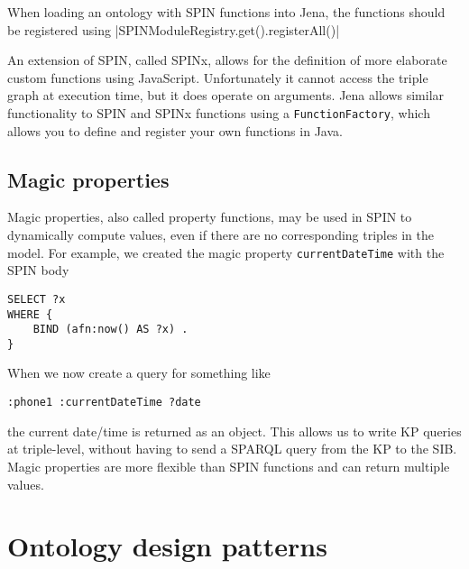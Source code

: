 
When loading an ontology with SPIN functions into Jena, the functions should be registered using |SPINModuleRegistry.get().registerAll()|

An extension of \ac{SPIN}, called SPINx, allows for the definition of more elaborate custom functions using JavaScript. Unfortunately it cannot access the triple graph at execution time, but it does operate on arguments. Jena allows similar functionality to \ac{SPIN} and SPINx functions using a \texttt{FunctionFactory}, which allows you to define and register your own functions in Java.

\subsection{Magic properties}
\label{magicproperties}
Magic properties, also called property functions, may be used in \ac{SPIN} to dynamically compute values, even if there are no corresponding triples in the model. For example, we created the magic property \texttt{currentDateTime} with the \ac{SPIN} body


\begin{verbatim}
SELECT ?x
WHERE {
    BIND (afn:now() AS ?x) .
}
\end{verbatim}

When we now create a query for something like 

\begin{verbatim}
:phone1 :currentDateTime ?date
\end{verbatim}

the current date/time is returned as an object. This allows us to write \ac{KP} queries at triple-level, without having to send a \ac{SPARQL} query from the \ac{KP} to the \ac{SIB}. Magic properties are more flexible than \ac{SPIN} functions and can return multiple values.




\section{Ontology design patterns}\label{DesignPatterns}

